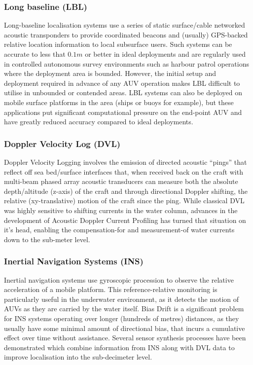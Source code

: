 \documentclass[conference,compsoc,letterpaper]{IEEEtran}
\begin{document}
\subsubsection{Long baseline (LBL)}
Long-baseline localisation systems use a series of static surface/cable networked acoustic transponders to provide coordinated beacons and (usually) GPS-backed relative location information to local subsurface users. 
Such systems can be accurate to less that $0.1m$ or better in ideal deployments and are regularly used in controlled autonomous survey environments such as harbour patrol operations where the deployment area is bounded. 
However, the initial setup and deployment required in advance of any AUV operation makes LBL difficult to utilise in unbounded or contended areas.
LBL systems can also be deployed on mobile surface platforms in the area (ships or buoys for example), but these applications put significant computational pressure on the end-point AUV and have greatly reduced accuracy compared to ideal deployments\cite{Matos1999}.
\subsubsection{Doppler Velocity Log (DVL)}
Doppler Velocity Logging involves the emission of directed acoustic ``pings'' that reflect off sea bed/surface interfaces that, when received back on the craft with multi-beam phased array acoustic transducers can measure both the absolute depth/altitude (z-axis) of the craft and through directional Doppler shifting, the relative (xy-translative) motion of the craft since the ping.
While classical DVL was highly sensitive to shifting currents in the water column, advances in the development of Acoustic Doppler Current Profiling has turned that situation on it's head, enabling the compensation-for and measurement-of water currents down to the sub-meter level\cite{Snyder2010}.
\subsubsection{Inertial Navigation Systems (INS)}
Inertial navigation systems use gyroscopic procession to observe the relative acceleration of a mobile platform.
This reference-relative monitoring is particularly useful in the underwater environment, as it detects the motion of AUVs as they are carried by the water itself.
Bias Drift is a significant problem for INS systems operating over longer (hundreds of metres) distances, as they usually have some minimal amount of directional bias, that incurs a cumulative effect over time without assistance.
Several sensor synthesis processes have been demonstrated which combine information from INS along with DVL data to improve localisation into the sub-decimeter level\cite{Jalving2003}\cite{Liu2014}.
\end{document}
